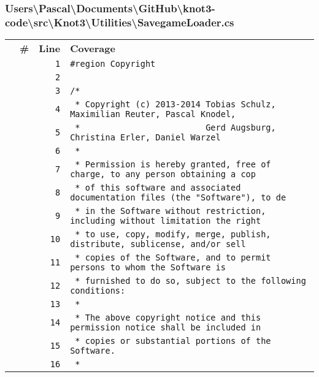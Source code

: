 \documentclass[a4paper,10pt]{article}
\begin{document}
\subsubsection{Users\textbackslash Pascal\textbackslash Documents\textbackslash GitHub\textbackslash knot3-code\textbackslash src\textbackslash Knot3\textbackslash Utilities\textbackslash SavegameLoader.cs}
\begin{longtable}[l]{lrrl}
\textbf{} & \textbf{\#} & \textbf{Line} & \textbf{Coverage}\\
\cellcolor{gray} &  & \verb~1~ & \verb~#region Copyright~\\
\cellcolor{gray} &  & \verb~2~ & \verb~~\\
\cellcolor{gray} &  & \verb~3~ & \verb~/*~\\
\cellcolor{gray} &  & \verb~4~ & \verb~ * Copyright (c) 2013-2014 Tobias Schulz, Maximilian Reuter, Pascal Knodel,~\\
\cellcolor{gray} &  & \verb~5~ & \verb~ *                         Gerd Augsburg, Christina Erler, Daniel Warzel~\\
\cellcolor{gray} &  & \verb~6~ & \verb~ *~\\
\cellcolor{gray} &  & \verb~7~ & \verb~ * Permission is hereby granted, free of charge, to any person obtaining a cop~\\
\cellcolor{gray} &  & \verb~8~ & \verb~ * of this software and associated documentation files (the "Software"), to de~\\
\cellcolor{gray} &  & \verb~9~ & \verb~ * in the Software without restriction, including without limitation the right~\\
\cellcolor{gray} &  & \verb~10~ & \verb~ * to use, copy, modify, merge, publish, distribute, sublicense, and/or sell~\\
\cellcolor{gray} &  & \verb~11~ & \verb~ * copies of the Software, and to permit persons to whom the Software is~\\
\cellcolor{gray} &  & \verb~12~ & \verb~ * furnished to do so, subject to the following conditions:~\\
\cellcolor{gray} &  & \verb~13~ & \verb~ *~\\
\cellcolor{gray} &  & \verb~14~ & \verb~ * The above copyright notice and this permission notice shall be included in ~\\
\cellcolor{gray} &  & \verb~15~ & \verb~ * copies or substantial portions of the Software.~\\
\cellcolor{gray} &  & \verb~16~ & \verb~ *~\\

\end{longtable}
\end{document}
